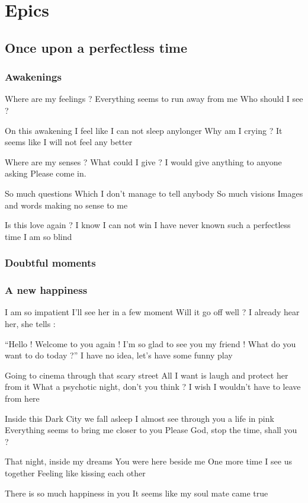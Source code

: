 \documentclass{article}
\newenvironment{album}[1]%
{%
  \section*{#1}
}%
{%
}
\newenvironment{song}[1]%
{%
  \subsection*{\textbf{#1}}
  \begin{multicols*}{2}
}%
{%
  \end{multicols*}
  \newpage
}
\newenvironment{partie}[1]%
{%
  \subsubsection{#1}
}%
{%
}
\newenvironment{couplet} %
{%
  \verbatim
}%
{% end code
  \endverbatim
}
\newenvironment{refrain} %
{%
  \verbatim
}%
{% end code
  \endverbatim
}
\newenvironment{pont} %
{%
  \verbatim
}%
{% end code
  \endverbatim
}
\begin{document}
\begin{album}{Epics}
\begin{song}{Once upon a perfectless time}
\begin{partie}{Awakenings}
\begin{refrain}
Where are my feelings ?
Everything seems to run away from me
Who should I see ?
\end{refrain}
\begin{couplet}
On this awakening
I feel like I can not sleep anylonger
Why am I crying ?
It seems like I will not feel any better
\end{couplet}
\begin{refrain}
Where are my senses ?
What could I give ?
I would give anything to anyone asking
Please come in.
\end{refrain}
\begin{couplet}
So much questions
Which I don’t manage to tell anybody
So much visions
Images and words making no sense to me
\end{couplet}
\begin{refrain}
Is this love again ?
I know I can not win
I have never known such a perfectless time
I am so blind  
\end{refrain}
\end{partie}
\begin{partie}{Doubtful moments}
\end{partie}
\begin{partie}{A new happiness}
\begin{couplet}
I am so impatient
I’ll see her in a few moment
Will it go off well ?
I already hear her, she tells :
\end{couplet}
\begin{refrain}
“Hello ! Welcome to you again !
I’m so glad to see you my friend !
What do you want to do today ?”
I have no idea, let’s have some funny play 
\end{refrain}
\begin{couplet}
Going to cinema through that scary street
All I want is laugh and protect her from it
What a psychotic night, don’t you think ?
I wish I wouldn’t have to leave from here
\end{couplet}
\begin{refrain}
Inside this Dark City we fall asleep
I almost see through you a life in pink
Everything seems to bring me closer to you
Please God, stop the time, shall you ? 
\end{refrain}
\begin{pont}
That night, inside my dreams 
You were here beside me
One more time I see us together
Feeling like kissing each other
\end{pont}
\begin{refrain}
There is so much happiness in you
It seems like my soul mate came true

\end{refrain}
\end{partie}
\end{song}
\end{album}
\end{document}
